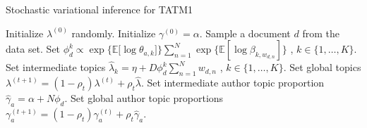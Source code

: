 \begin{algorithm}[tb]
\caption{Stochastic variational inference for TATM1}
\label{alg:stoch_tatm1}
\begin{algorithmic}[1]
	\STATE Initialize $\lambda^{(0)}$ randomly.
	\STATE Initialize $\gamma^{(0)} = \alpha$.
	\REPEAT
		\STATE Sample a document $d$ from the data set.
		\STATE Set $\phi^k_{d} \propto \exp{ \{ \mathbb{E}[\log \theta_{a,k}} ]\} \sum_{n=1}^{N}  \exp \{ \mathbb{E}[\log \beta_{k,w_{d,n}}] \}$ , $k \in \{ 1, \ldots, K \}$.
		\STATE Set intermediate topics $\hat{\lambda}_k = \eta +D \phi_d^k \sum_{n=1}^{N}{w_{d,n}}$ , $k\in\{1,\dots,K\}$.
		\STATE Set global topics $\lambda^{(t+1)} = (1 - \rho_t) \lambda^{(t)} + \rho_t \hat{\lambda}$.
		\STATE Set intermediate author topic proportion $\hat{\gamma}_a = \alpha +  N \phi_d$.
		\STATE Set global author topic proportions $\gamma_a^{(t+1)} = (1 - \rho_t) \gamma_a^{(t)} + \rho_t \hat{\gamma}_a$.
\end{algorithmic}
\end{algorithm}